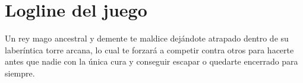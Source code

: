 \section{Logline del juego}%

Un rey mago ancestral y demente te maldice dejándote atrapado dentro de su
laberíntica torre arcana, lo cual te forzará a competir contra otros para
hacerte antes que nadie con la única cura y conseguir escapar o quedarte
encerrado para siempre.



